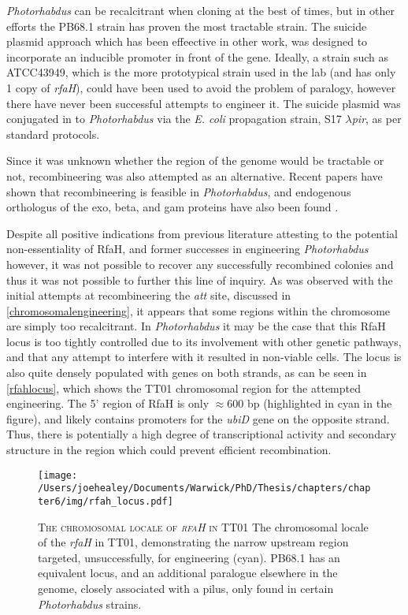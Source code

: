 \emph{Photorhabdus} can be recalcitrant when cloning at the best of times, but in other efforts the PB68.1 strain has proven the most tractable \Pasy{} strain. The suicide plasmid approach which has been effeective in other work, was designed to incorporate an inducible promoter in front of the gene. Ideally, a \Pasy{} strain such as ATCC43949, which is the more prototypical \Pasy{} strain used in the lab (and has only 1 copy of \emph{rfaH}), could have been used to avoid the problem of paralogy, however there have never been successful attempts to engineer it. The suicide plasmid was conjugated in to \emph{Photorhabdus} via the \emph{E. coli} propagation strain, S17 $\lambda$\emph{pir}, as per standard protocols.

Since it was unknown whether the region of the genome would be tractable or not, recombineering was also attempted as an alternative. Recent papers have shown that recombineering is feasible in \emph{Photorhabdus}, and endogenous orthologus of the exo, beta, and gam proteins have also been found \citep{Yin2015}.

Despite all positive indications from previous literature attesting to the potential non-essentiality of RfaH, and former successes in engineering \emph{Photorhabdus} however, it was not possible to recover any successfully recombined colonies and thus it was not possible to further this line of inquiry. As was observed with the initial attempts at recombineering the \emph{att} site, discussed in \vref{chromosomalengineering}, it appears that some regions within the chromosome are simply too recalcitrant. In \emph{Photorhabdus} it may be the case that this RfaH locus is too tightly controlled due to its involvement with other genetic pathways, and that any attempt to interfere with it resulted in non-viable cells. The locus is also quite densely populated with genes on both strands, as can be seen in \vref{rfahlocus}, which shows the \Plum{} TT01 chromosomal region for the attempted engineering. The 5' region of RfaH is only $\approx$600 bp (highlighted in cyan in the figure), and likely contains promoters for the \emph{ubiD} gene on the opposite strand. Thus, there is potentially a high degree of transcriptional activity and secondary structure in the region which could prevent efficient recombination.

\begin{figure}[h!]
    \texttt{[image: /Users/joehealey/Documents/Warwick/PhD/Thesis/chapters/chapter6/img/rfah\_locus.pdf]}
    \captionsetup{singlelinecheck=off, justification=justified, font=footnotesize, aboveskip=5pt}
    \caption[RfaH locale in \Plum{} TT01]{\textsc{\normalsize The chromosomal locale of \emph{rfaH} in \Plum{} TT01} \vspace{0.1cm} \newline The chromosomal locale of the \emph{rfaH} in \Plum{} TT01, demonstrating the narrow upstream region targeted, unsuccessfully, for engineering (cyan). \Pasy{} PB68.1 has an equivalent locus, and an additional paralogue elsewhere in the genome, closely associated with a pilus, only found in certain \emph{Photorhabdus} strains.}
\label{rfahlocus}
\end{figure}

